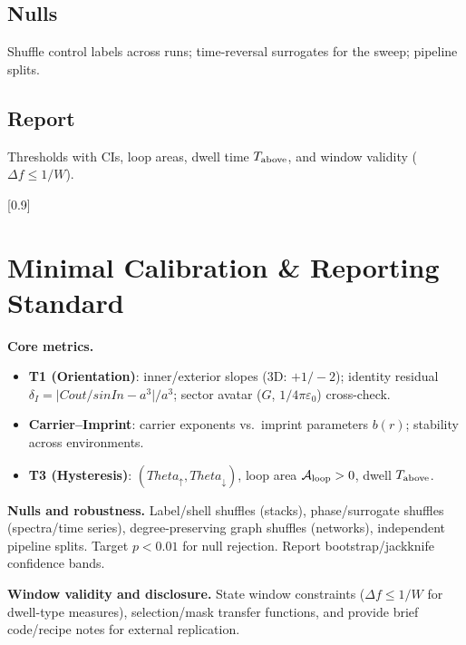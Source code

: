 \documentclass[12pt,a4paper,oneside]{scrreprt}
\def\Cout{Cout}%
\def\sinIn{sinIn}%
\def\Theta{Theta}%
\newcommand{\sinIn}{s_{\mathrm{in}}}
\newcommand{\Cout}{C_{\mathrm{out}}}
\begin{document}
\section*{Nulls}
Shuffle control labels across runs; time-reversal surrogates for the sweep; pipeline splits.

\section*{Report}
Thresholds with CIs, loop areas, dwell time $T_{\rm above}$, and window validity ($\Delta f\le 1/W$).

[0.9]

\chapter*{Minimal Calibration \& Reporting Standard}
\noindent\textbf{Core metrics.}
\begin{itemize}\setlength\itemsep{0.2em}
\item \textbf{T1 (Orientation)}: inner/exterior slopes (3D: $+1/-2$); identity residual $\delta_I=\big|\Cout/\sinIn-a^3\big|/a^3$; sector avatar ($G$, $1/4\pi\varepsilon_0$) cross-check.
\item \textbf{Carrier–Imprint}: carrier exponents vs.\ imprint parameters $b(r)$; stability across environments.
\item \textbf{T3 (Hysteresis)}: $(\Theta_\uparrow,\Theta_\downarrow)$, loop area $\mathcal A_{\rm loop}>0$, dwell $T_{\rm above}$.
\end{itemize}

\noindent\textbf{Nulls and robustness.}
Label/shell shuffles (stacks), phase/surrogate shuffles (spectra/time series), degree-preserving graph shuffles (networks), independent pipeline splits. Target $p<0.01$ for null rejection. Report bootstrap/jackknife confidence bands.

\noindent\textbf{Window validity and disclosure.}
State window constraints ($\Delta f\le1/W$ for dwell-type measures), selection/mask transfer functions, and provide brief code/recipe notes for external replication.
\end{document}
